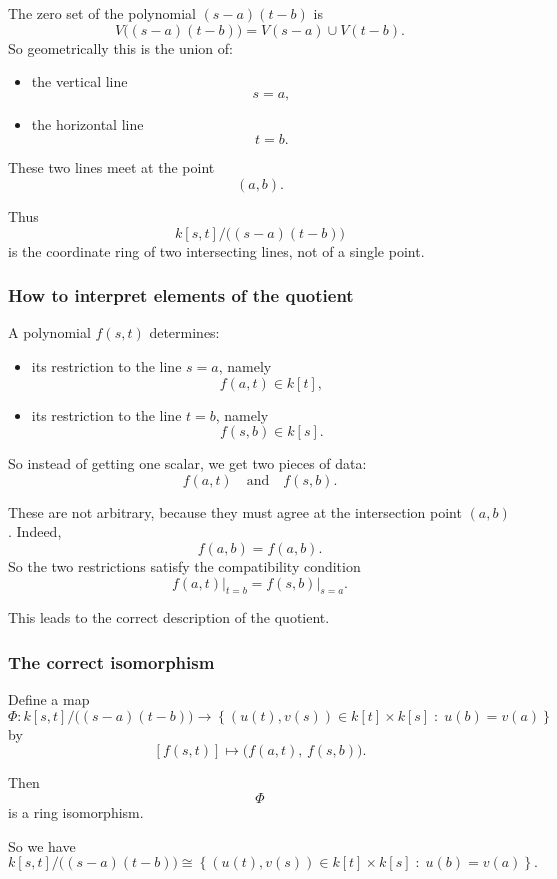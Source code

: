 \documentclass[12pt,a4paper]{article}
\theoremstyle{notespace}
\theoremstyle{definition}
\begin{document}
The zero set of the polynomial \((s-a)(t-b)\) is
\[
V\bigl((s-a)(t-b)\bigr)=V(s-a)\cup V(t-b).
\]
So geometrically this is the union of:

\begin{itemize}
	\item the vertical line
	\[
	s=a,
	\]
	\item the horizontal line
	\[
	t=b.
	\]
\end{itemize}

These two lines meet at the point
\[
(a,b).
\]

Thus
\[
k[s,t]\big/\bigl((s-a)(t-b)\bigr)
\]
is the coordinate ring of two intersecting lines, not of a single point.

\subsubsection{How to interpret elements of the quotient}

A polynomial \(f(s,t)\) determines:

\begin{itemize}
	\item its restriction to the line \(s=a\), namely
	\[
	f(a,t)\in k[t],
	\]
	\item its restriction to the line \(t=b\), namely
	\[
	f(s,b)\in k[s].
	\]
\end{itemize}

So instead of getting one scalar, we get two pieces of data:
\[
f(a,t)\quad\text{and}\quad f(s,b).
\]

These are not arbitrary, because they must agree at the intersection point \((a,b)\). Indeed,
\[
f(a,b)=f(a,b).
\]
So the two restrictions satisfy the compatibility condition
\[
f(a,t)\big|_{t=b}=f(s,b)\big|_{s=a}.
\]

This leads to the correct description of the quotient.

\subsubsection{The correct isomorphism}

Define a map
\[
\Phi:
k[s,t]\big/\bigl((s-a)(t-b)\bigr)
\longrightarrow
\left\{(u(t),v(s))\in k[t]\times k[s]\;:\; u(b)=v(a)\right\}
\]
by
\[
[f(s,t)]\longmapsto \bigl(f(a,t),\,f(s,b)\bigr).
\]

Then
\[
\Phi
\]
is a ring isomorphism.

So we have
\[
k[s,t]\big/\bigl((s-a)(t-b)\bigr)
\cong
\left\{(u(t),v(s))\in k[t]\times k[s]\;:\; u(b)=v(a)\right\}.
\]
\end{document}
